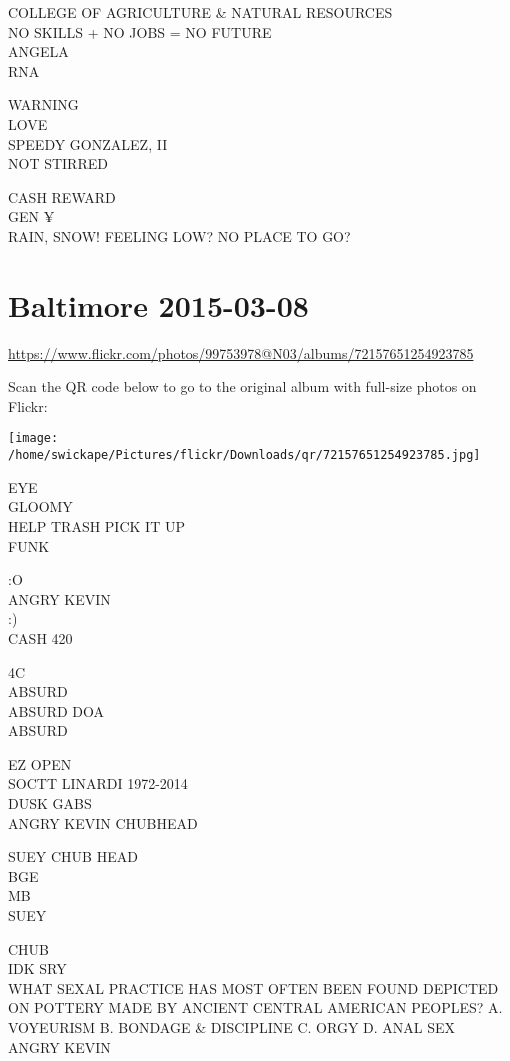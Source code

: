 \documentclass[10pt,letterpaper]{article}
\begin{document}
COLLEGE OF AGRICULTURE \& NATURAL RESOURCES\\
NO SKILLS + NO JOBS = NO FUTURE\\
ANGELA\\
RNA

WARNING\\
LOVE\\
SPEEDY GONZALEZ, II\\
NOT STIRRED

CASH REWARD\\
GEN ¥\\
RAIN, SNOW!  FEELING LOW?  NO PLACE TO GO?


\section*{Baltimore 2015-03-08}

\url{https://www.flickr.com/photos/99753978@N03/albums/72157651254923785}

Scan the QR code below to go to the original album with full-size photos on Flickr:

\texttt{[image: /home/swickape/Pictures/flickr/Downloads/qr/72157651254923785.jpg]}


EYE\\
GLOOMY\\
HELP TRASH PICK IT UP\\
FUNK

:O\\
ANGRY KEVIN\\
:)\\
CASH 420

4C\\
ABSURD\\
ABSURD DOA\\
ABSURD

EZ OPEN\\
SOCTT LINARDI 1972{-}2014\\
DUSK GABS\\
ANGRY KEVIN CHUBHEAD

SUEY CHUB HEAD\\
BGE\\
MB\\
SUEY

CHUB\\
IDK SRY\\
WHAT SEXAL PRACTICE HAS MOST OFTEN BEEN FOUND DEPICTED ON POTTERY MADE BY ANCIENT CENTRAL AMERICAN PEOPLES?  A. VOYEURISM B. BONDAGE \& DISCIPLINE C. ORGY D. ANAL SEX\\
ANGRY KEVIN
\end{document}
